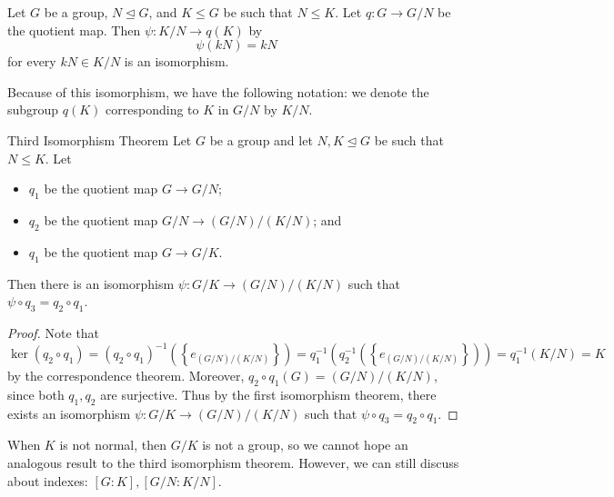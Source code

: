 \documentclass[pmath347]{subfiles}
\begin{document}
    \clearpage
    \begin{prop}{}
        Let $G$ be a group, $N\trianglelefteq G$, and $K\leq G$ be such that $N\leq K$. Let $q:G\to G /N$ be the quotient map. Then $\psi:K /N\to q\left( K \right)$ by
        \begin{equation*}
            \psi\left( kN \right) = kN
        \end{equation*}
        for every $kN\in K /N$ is an isomorphism.
    \end{prop}

    \noindent Because of this isomorphism, we have the following notation: we denote the subgroup $q\left( K \right)$ corresponding to $K$ in $G /N$ by $K /N$.

    \begin{theorem}{Third Isomorphism Theorem}
        Let $G$ be a group and let $N,K\trianglelefteq G$ be such that $N\leq K$. Let
        \begin{itemize}
            \item $q_1$ be the quotient map $G\to G /N$;
            \item $q_2$ be the quotient map $G /N\to \left( G /N \right) /\left( K /N \right) $; and
            \item $q_1$ be the quotient map $G\to G /K$.
        \end{itemize} 
        Then there is an isomorphism $\psi:G/ K\to \left( G /N \right) / \left( K /N \right) $ such that $\psi\circ q_3 = q_2\circ q_1$.
    \end{theorem}

    \begin{proof}
        Note that
        \begin{equation*}
            \ker\left( q_2\circ q_1 \right) = \left( q_2\circ q_1 \right) ^{-1} \left( \left\lbrace e_{\left( G /N \right) / \left( K /N\right) } \right\rbrace  \right) = q_1^{-1} \left( q_2^{-1} \left( \left\lbrace e_{\left( G /N \right) / \left( K /N\right) } \right\rbrace  \right)  \right) = q_1^{-1} \left( K /N \right) = K
        \end{equation*}
        by the correspondence theorem. Moreover, $q_2\circ q_1\left( G \right) = \left( G /N \right) /\left( K /N \right)$, since both $q_1,q_2$ are surjective. Thus by the first isomorphism theorem, there exists an isomorphism $\psi:G /K\to \left( G /N \right) /\left( K /N \right)$ such that $\psi\circ q_3 = q_2\circ q_1$.
    \end{proof}

    \np When $K$ is not normal, then $G /K$ is not a group, so we cannot hope an analogous result to the third isomorphism theorem. However, we can still discuss about indexes: $\left[ G:K \right], \left[ G /N: K /N\right]$.
\end{document}
